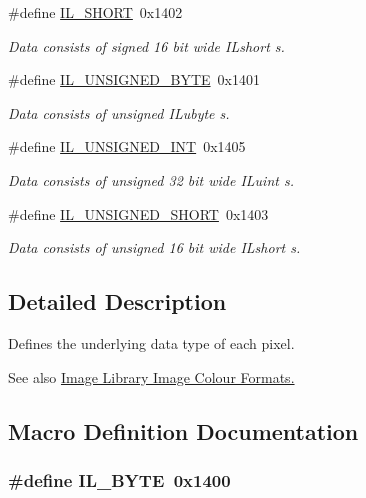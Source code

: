 \begin{DoxyCompactItemize}
\#define \hyperlink{group__il__data__types_gac09bde8c51a0a780d68a6480842ae7bb}{I\+L\+\_\+\+S\+H\+O\+R\+T}~0x1402
\begin{DoxyCompactList}\small\item\em Data consists of signed 16 bit wide {\itshape I\+Lshort} s. \end{DoxyCompactList}\item 
\#define \hyperlink{group__il__data__types_ga22e9e14d5d5a8eb1de1766e72f4fd6e9}{I\+L\+\_\+\+U\+N\+S\+I\+G\+N\+E\+D\+\_\+\+B\+Y\+T\+E}~0x1401
\begin{DoxyCompactList}\small\item\em Data consists of unsigned {\itshape I\+Lubyte} s. \end{DoxyCompactList}\item 
\#define \hyperlink{group__il__data__types_gae6c1c42df44ca27d43803237a6a95a01}{I\+L\+\_\+\+U\+N\+S\+I\+G\+N\+E\+D\+\_\+\+I\+N\+T}~0x1405
\begin{DoxyCompactList}\small\item\em Data consists of unsigned 32 bit wide {\itshape I\+Luint} s. \end{DoxyCompactList}\item 
\#define \hyperlink{group__il__data__types_gaf300b01dedef0e94945c59ffc9b65531}{I\+L\+\_\+\+U\+N\+S\+I\+G\+N\+E\+D\+\_\+\+S\+H\+O\+R\+T}~0x1403
\begin{DoxyCompactList}\small\item\em Data consists of unsigned 16 bit wide {\itshape I\+Lshort} s. \end{DoxyCompactList}\end{DoxyCompactItemize}


\subsection{Detailed Description}
Defines the underlying data type of each pixel. 

\begin{DoxySeeAlso}{See also}
\hyperlink{group__il__data__formats}{Image Library Image Colour Formats.} 
\end{DoxySeeAlso}


\subsection{Macro Definition Documentation}
\hypertarget{group__il__data__types_ga5a1e68002c5c3108e1fea27cb8b75330}{
\subsubsection[{I\+L\+\_\+\+B\+Y\+T\+E}]{\setlength{\rightskip}{0pt plus 5cm}\#define I\+L\+\_\+\+B\+Y\+T\+E~0x1400}}\label{group__il__data__types_ga5a1e68002c5c3108e1fea27cb8b75330}


